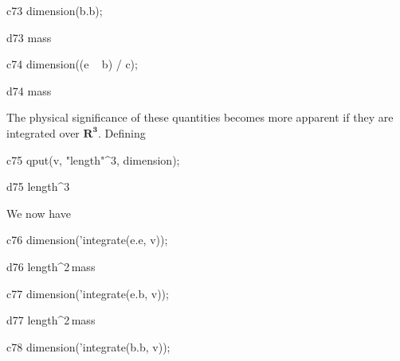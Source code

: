\documentclass[12pt]{article}
\begin{document}
\begin{mcline}{c73}
dimension(b.b);
\end{mcline}



\begin{mdline}{d73}
{{mass}}
\end{mdline}

\begin{mcline}{c74}
dimension((e ~ b) / c);
\end{mcline}



\begin{mdline}{d74}
{{mass}}
\end{mdline}


\vspace{0.1in}

\noindent The physical significance of these quantities becomes more apparent
if they are integrated over $\mathbf{R^3}$.  Defining

\vspace{0.1in}

\begin{mcline}{c75}
qput(v, "length"^3, dimension);
\end{mcline}



\begin{mdline}{d75}
length^3
\end{mdline}

\vspace{0.1in}

\noindent We now have


\begin{mcline}{c76}
dimension('integrate(e.e, v));
\end{mcline}



\begin{mdline}{d76}
{{length^2\,mass}}
\end{mdline}

\begin{mcline}{c77}
dimension('integrate(e.b, v));
\end{mcline}

\begin{mdline}{d77}
{{length^2\,mass}}
\end{mdline}

\begin{mcline}{c78}
dimension('integrate(b.b, v));
\end{mcline}
\end{document}
